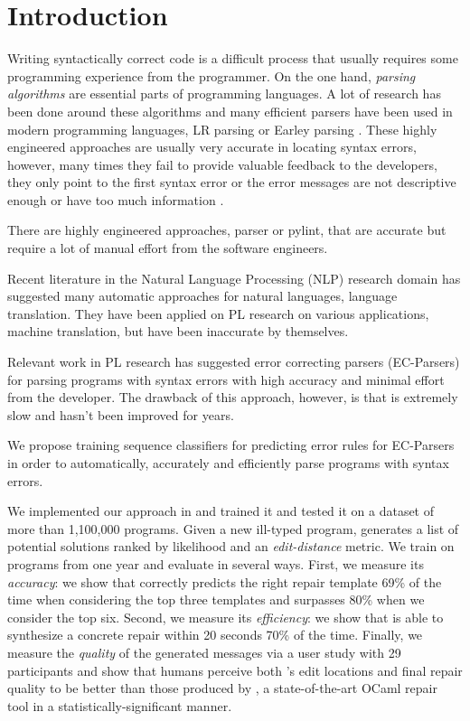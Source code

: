 \section{Introduction}
\label{sec:intro}

Writing syntactically correct code is a difficult process that usually requires
some programming experience from the programmer. On the one hand, \emph{parsing
algorithms} are essential parts of programming languages. A lot of research has
been done around these algorithms and many efficient parsers have been used in
modern programming languages, \eg LR parsing \citep{Aho1974} or Earley parsing
\citep{Earley_1970}. These highly engineered approaches are usually very
accurate in locating syntax errors, however, many times they fail to provide
valuable feedback to the developers, \eg they only point to the first syntax
error or the error messages are not descriptive enough or have too much
information \citep{Kummerfeld2003}.

There are highly engineered approaches, \eg parser or pylint, that are accurate
but require a lot of manual effort from the software engineers.

Recent literature in the Natural Language Processing (NLP) research domain has
suggested many automatic approaches for natural languages, \eg language
translation. They have been applied on PL research on various applications, \eg
machine translation, but have been inaccurate by themselves.

Relevant work in PL research has suggested error correcting parsers (EC-Parsers)
for parsing programs with syntax errors with high accuracy and minimal effort
from the developer. The drawback of this approach, however, is that is extremely
slow and hasn't been improved for years.

\mypara{\toolname}
We propose training sequence classifiers for predicting error rules for
EC-Parsers in order to automatically, accurately and efficiently parse programs
with syntax errors.

We implemented our approach in \toolname and trained it and tested it on a
dataset of more than 1,100,000 programs. Given a new ill-typed program,
\toolname generates a list of potential solutions ranked by likelihood and an
\emph{edit-distance} metric. We train \toolname on programs from one year and
evaluate in several ways.
%
First, we measure its \emph{accuracy}: we show that \toolname correctly predicts
the right repair template 69\% of the time when considering the top three
templates and surpasses 80\% when we consider the top six.
%
Second, we measure its \emph{efficiency}: we show that \toolname is able to
synthesize a concrete repair within 20 seconds 70\% of the time.
%
Finally, we measure the \emph{quality} of the generated messages via a user
study with 29 participants and show that humans perceive both \toolname's edit
locations and final repair quality to be better than those produced by \seminal,
a state-of-the-art OCaml repair tool \citep{Lerner2007-dt} in a
statistically-significant manner.

